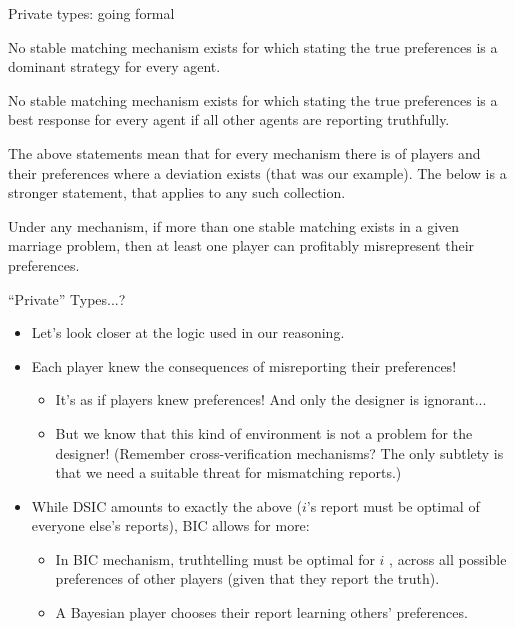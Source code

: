 \documentclass[english,10pt
,aspectratio=169
]{beamer}
\begin{document}
\begin{frame}{Private types: going formal}
\begin{theorem}[Roth]
	No stable matching mechanism exists for which stating the true preferences is a dominant strategy for every agent.
\end{theorem}
\begin{theorem}
	No stable matching mechanism exists for which stating the true preferences is a best response for every agent if all other agents are reporting truthfully.
\end{theorem}
{\small 
	The above statements mean that for every mechanism there is  of players and their preferences where a deviation exists (that was our example). The below is a stronger statement, that applies to \alert{any} such \alert{collection}.
}
\begin{theorem}
	Under any mechanism, if more than one stable matching exists in a given marriage problem, then at least one player can profitably misrepresent their preferences.
\end{theorem}
\end{frame}


\begin{frame}{``Private'' Types...?}
\begin{itemize}
	\item Let's look closer at the logic used in our reasoning.
	\item Each player \alert{knew} the consequences of misreporting their preferences! 
	\begin{itemize}
		\item It's as if  players knew  preferences! And only the designer is ignorant...
		\item But we know that this kind of environment is not a problem for the designer! (Remember cross-verification mechanisms? The only subtlety is that we need a suitable threat for mismatching reports.)
	\end{itemize}
	\item While DSIC amounts to exactly the above ($i$'s report must be optimal  of everyone else's reports), BIC allows for more:
	\begin{itemize}
		\item In BIC mechanism, truthtelling must be optimal for $i$ , across all possible preferences of other players (given that they report the truth).
		\item A Bayesian player chooses their report  learning others' preferences.
	\end{itemize}
\end{itemize}
\end{frame}
\end{document}

